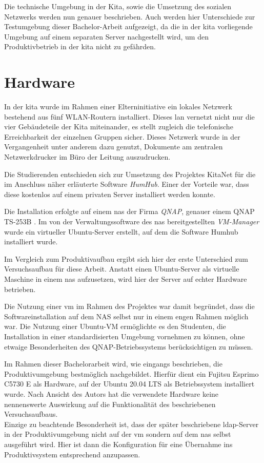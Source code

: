 Die technische Umgebung in der Kita, sowie die Umsetzung des sozialen Netzwerks werden nun genauer beschrieben. Auch werden hier Unterschiede zur Testumgebung dieser Bachelor-Arbeit aufgezeigt, da die in der \ac{kita} vorliegende Umgebung auf einem separaten Server nachgestellt wird, um den Produktivbetrieb in der \ac{kita} nicht zu gefährden.

\section{Hardware}

In der \ac{kita} wurde im Rahmen einer Elterninitiative ein lokales Netzwerk bestehend aus fünf WLAN-Routern installiert. Dieses \ac{lan} vernetzt nicht nur die vier Gebäudeteile der Kita miteinander, es stellt zugleich die telefonische Erreichbarkeit der einzelnen Gruppen sicher. Dieses Netzwerk wurde in der Vergangenheit unter anderem dazu genutzt, Dokumente am zentralen Netzwerkdrucker im Büro der Leitung auszudrucken.

Die Studierenden entschieden sich zur Umsetzung des Projektes KitaNet für die im Anschluss näher erläuterte Software \textit{HumHub}.
Einer der Vorteile war, dass diese kostenlos auf einem privaten Server installiert werden konnte. 

Die Installation erfolgte auf einem \ac{nas} der Firma \textit{QNAP}, genauer einem QNAP TS-253B \citep[vgl.][]{qnap}. 
Im von der Verwaltungssoftware des \ac{nas} bereitgestellten \textit{VM-Manager} wurde ein virtueller Ubuntu-Server erstellt, auf dem die Software Humhub installiert wurde.

Im Vergleich zum Produktivaufbau ergibt sich hier der erste Unterschied zum Versuchsaufbau für diese Arbeit.
Anstatt einen Ubuntu-Server als virtuelle Maschine in einem \ac{nas} aufzusetzen, wird hier der Server auf echter Hardware betrieben. 

Die Nutzung einer \ac{vm} im Rahmen des Projektes war damit begründet, dass die Softwareinstallation auf dem NAS selbst nur in einem engen Rahmen möglich war. Die Nutzung einer Ubuntu-VM ermöglichte es den Studenten, die Installation in einer standardisierten Umgebung vornehmen zu können, ohne etwaige Besonderheiten des QNAP-Betriebssystems berücksichtigen zu müssen.

Im Rahmen dieser Bachelorarbeit wird, wie eingangs beschrieben, die Produktivumgebung bestmöglich nachgebildet. 
Hierfür dient ein Fujitsu Esprimo C5730 E als Hardware, auf der Ubuntu 20.04 LTS als Betriebssystem installiert wurde. 
Nach Ansicht des Autors hat die verwendete Hardware keine nennenswerte Auswirkung auf die Funktionalität des beschriebenen Versuchsaufbaus. \\ 
Einzige zu beachtende Besonderheit ist, dass der später beschriebene \ac{ldap}-Server in der Produktivumgebung nicht auf der \ac{vm} sondern auf dem \ac{nas} selbst ausgeführt wird. Hier ist dann die Konfiguration für eine Übernahme ins Produktivsystem entsprechend anzupassen.


